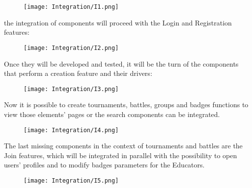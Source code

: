 \begin{figure}[H]
    \begin{center}
        \texttt{[image: Integration/I1.png]}
        \label{fig:Integration_1}%
    \end{center}
\end{figure}


the integration of components will proceed with the Login and Registration features:

\begin{figure}[H]
    \begin{center}
        \texttt{[image: Integration/I2.png]}
        \label{fig:Integration_2}%
    \end{center}
\end{figure}

Once they will be developed and tested, it will be the turn of the components that perform a creation feature and their drivers:

\begin{figure}[H]
    \begin{center}
        \texttt{[image: Integration/I3.png]}
        \label{fig:Integration_3}%
    \end{center}
\end{figure}

Now it is possible to create tournaments, battles, groups and badges functions to view those elements’ pages or the search components can be integrated.


\begin{figure}[H]
    \begin{center}
        \texttt{[image: Integration/I4.png]}
        \label{fig:Integration_4}%
    \end{center}
\end{figure}

The last missing components in the context of tournaments and battles are the Join features, which will be integrated in parallel with the possibility to open users’ profiles and to modify badges parameters for the Educators.


\begin{figure}[H]
    \begin{center}
        \texttt{[image: Integration/I5.png]}
        \label{fig:Integration_5}%
    \end{center}
\end{figure}

